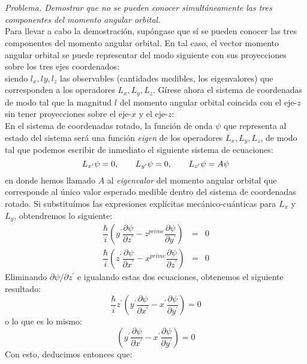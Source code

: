 \\
\\
\textit{Problema. Demostrar que no se pueden conocer simultáneamente las tres componentes del momento angular orbital.}
\\
Para llevar a cabo la demostración, supóngase que sí se pueden conocer las tres componentes del momento angular orbital. En tal caso, el vector momento angular orbital se puede representar del modo siguiente con sus proyecciones sobre los tres ejes coordenados:
\\
siendo $l_{x}, l_{}y, l_{z}$  las observables (cantidades medibles, los eigenvalores) que corresponden a los operadores $L_{x}, L_{y} , L_{z}$. Gírese ahora el sistema de coordenadas de modo tal que la magnitud $l$ del momento angular orbital coincida con el eje-$z$ sin tener proyecciones sobre el eje-$x$ y el eje-$z$:
\\
En el sistema de coordenadas rotado, la función de onda $\psi$ que representa al estado del sistema será una función \emph{eigen} de los operadores $L_{x}, L_{y}, L_{z}$, de modo tal que podemos escribir de inmediato el siguiente sistema de ecuaciones:
\[ L_{x^{\prime}} \psi = 0, \hspace{0.7cm} L_{y^{\prime}} \psi = 0, \hspace{0.7cm} L_{z^{\prime}} \psi = A \psi \]
en donde hemos llamado $A$ al \emph{eigenvalor} del momento angular orbital que corresponde al único valor esperado medible dentro del sistema de coordenadas rotado. Si substituímos las expresiones explícitas mecánico-cuánticas para $L_{x}$ y $L_{y}$, obtendremos lo siguiente:
\begin{eqnarray*}
\dfrac{\hbar}{i} \left( y^{\prime} \dfrac{\partial \psi}{\partial z^{\prime}} - z^{prime} \dfrac{\partial \psi}{\partial y^{\prime}} \right) &=& 0 \nonumber \\
\dfrac{\hbar}{i} \left( z^{\prime} \dfrac{\partial \psi}{\partial x^{\prime}} - x^{prime} \dfrac{\partial \psi}{\partial z^{\prime}} \right) &=& 0 \nonumber 
\end{eqnarray*}
Eliminando $\partial \psi / \partial z^{\prime}$ e igualando estas dos ecuaciones, obtenemos el siguiente resultado:
\[ \dfrac{\hbar}{i} z^{\prime} \left( y^{\prime} \dfrac{\partial \psi}{\partial x^{\prime}} - x^{\prime} \dfrac{\partial \psi}{\partial y^{\prime}} \right) = 0 \]
o lo que es lo mismo:
\[ \left( y^{\prime} \dfrac{\partial \psi}{\partial x^{\prime}} - x^{\prime} \dfrac{\partial \psi}{\partial y^{\prime}} \right) = 0 \]
Con esto, deducimos entonces que:
